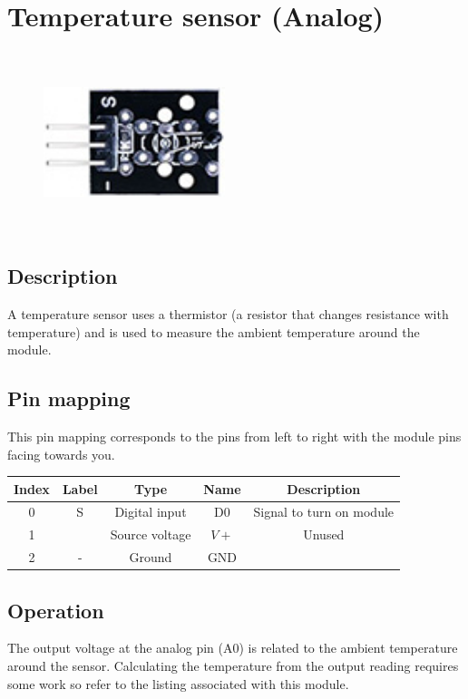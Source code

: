 \section{Temperature sensor (Analog)}
\begin{figure}[H]
    \centering
    \includegraphics[angle=0, keepaspectratio=true, scale=1, width=200px, height=200px]{images/temperature_analog.jpg}
\end{figure}
\subsection*{Description}
A temperature sensor uses a thermistor (a resistor that changes resistance with temperature) and is used to measure the ambient temperature around the module.
\subsection*{Pin mapping}
This pin mapping corresponds to the pins from left to right with the module pins facing towards you.
\begin{table}[H]
    \centering
    \begin{tabular}{|c|c|c|c|c|}
    \hline
    Index &Label &Type &Name &Description\\ \hline
    0 &S &Digital input &D0 &Signal to turn on module\\ \hline
    1 & &Source voltage &$V+$ &Unused\\ \hline
    2 &- &Ground &GND &\\ \hline
    \end{tabular}
\end{table}
\subsection*{Operation}
The output voltage at the analog pin (A0) is related to the ambient temperature around the sensor. Calculating the temperature from the output reading requires some work so refer to the listing associated with this module.
%